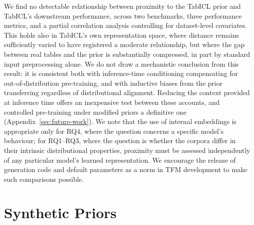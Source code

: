 \documentclass{article}
\begin{document}
We find no detectable relationship between proximity to the TabICL prior and TabICL's downstream performance, across two benchmarks, three performance metrics, and a partial correlation analysis controlling for dataset-level covariates. This holds also in TabICL's own representation space, where distance remains sufficiently varied to have registered a moderate relationship, but where the gap between real tables and the prior is substantially compressed, in part by standard input preprocessing alone. We do not draw a mechanistic conclusion from this result: it is consistent both with inference-time conditioning compensating for out-of-distribution pre-training, and with inductive biases from the prior transferring regardless of distributional alignment. Reducing the context provided at inference time offers an inexpensive test between these accounts, and controlled pre-training under modified priors a definitive one (Appendix~\ref{sec:future-work}). We note that the use of internal embeddings is appropriate only for RQ4, where the question concerns a specific model's behaviour; for RQ1–RQ3, where the question is whether the corpora differ in their intrinsic distributional properties, proximity must be assessed independently of any particular model's learned representation. We encourage the release of generation code and default parameters as a norm in TFM development to make such comparisons possible.




\clearpage
\newpage

\appendix



\section{Synthetic Priors}
\end{document}
